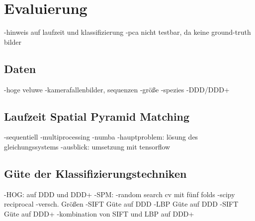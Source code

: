 \section{Evaluierung}

-hinweis auf laufzeit und klassifizierung
-pca nicht testbar, da keine ground-truth bilder

\subsection{Daten}

-hoge veluwe
-kamerafallenbilder, sequenzen
-größe
-spezies
-DDD/DDD+

\subsection{Laufzeit Spatial Pyramid Matching}

-sequentiell
-multiprocessing
-numba
-hauptproblem: lösung des gleichungssystems
-ausblick: umsetzung mit tensorflow

\subsection{Güte der Klassifizierungstechniken}

-HOG: auf DDD und DDD+
-SPM:
	-random search cv mit fünf folds
	-scipy reciprocal
	-versch. Größen
	-SIFT Güte auf DDD
	-LBP Güte auf DDD
	-SIFT Güte auf DDD+
	-kombination von SIFT und LBP auf DDD+
